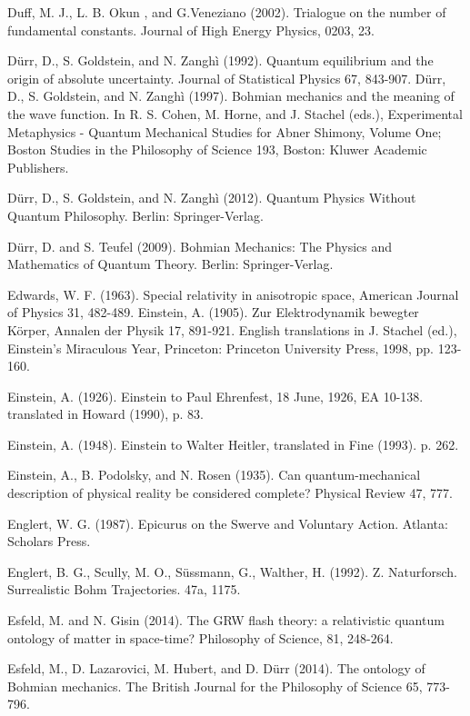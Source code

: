 \begin{thebibliography}{}
\bibitem{} Duff, M. J., L. B. Okun , and G.Veneziano (2002). Trialogue on the number of fundamental constants.  Journal of High Energy Physics, 0203, 23.

\bibitem{} D\"{u}rr, D., S. Goldstein,  and N. Zangh\`{i} (1992). Quantum equilibrium and the origin of absolute uncertainty. Journal of Statistical Physics 67, 843-907.
\bibitem{} D\"{u}rr, D., S. Goldstein, and  N. Zangh\`{i} (1997). Bohmian mechanics and the meaning of the wave function. In R. S. Cohen,  M. Horne, and J. Stachel (eds.), Experimental Metaphysics - Quantum Mechanical Studies for Abner Shimony, Volume One; Boston Studies in the Philosophy of Science 193, Boston: Kluwer Academic Publishers. 

\bibitem{} D\"{u}rr, D., S. Goldstein, and  N. Zangh\`{i} (2012). Quantum Physics Without Quantum Philosophy. Berlin: Springer-Verlag.

\bibitem{} D\"{u}rr, D. and S. Teufel (2009). Bohmian Mechanics: The Physics and Mathematics of Quantum Theory. Berlin: Springer-Verlag.

\bibitem{}  Edwards, W. F. (1963). Special relativity in anisotropic space, American Journal of Physics 31, 482-489.
\bibitem{} Einstein, A. (1905). Zur Elektrodynamik bewegter K\"{o}rper, Annalen der Physik 17, 891-921. English translations in J. Stachel (ed.), Einstein's Miraculous Year, Princeton: Princeton University Press, 1998, pp. 123-160.

\bibitem{} Einstein, A. (1926). Einstein to Paul Ehrenfest, 18 June, 1926, EA 10-138. translated
in Howard (1990), p. 83.

\bibitem{} Einstein, A. (1948). Einstein to Walter Heitler, translated in Fine (1993). p. 262.

\bibitem{} Einstein, A., B. Podolsky,  and N. Rosen (1935). Can quantum-mechanical description of physical reality be considered complete? Physical Review 47, 777.

\bibitem{} Englert, W. G. (1987). Epicurus on the Swerve and Voluntary Action. Atlanta: Scholars Press.

\bibitem{} Englert, B. G., Scully, M. O., S\"{u}ssmann, G., Walther, H. (1992). Z. Naturforsch. Surrealistic Bohm Trajectories. 47a, 1175.

\bibitem{} Esfeld, M. and N. Gisin (2014). The GRW flash theory: a relativistic quantum ontology of matter in space-time? Philosophy of Science, 81, 248-264.

\bibitem{} Esfeld, M., D. Lazarovici,  M. Hubert,  and  D. D\"{u}rr (2014). The ontology of Bohmian
mechanics. The British Journal for the Philosophy of Science 65, 773-796.


\end{thebibliography}
